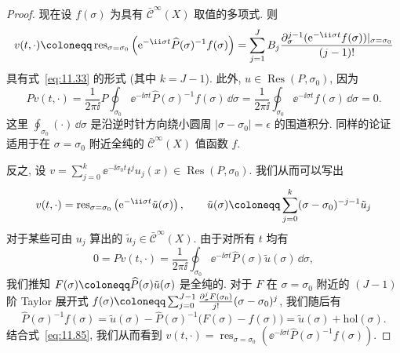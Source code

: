 \begin{proof}
现在设 $f(\sigma)$ 为具有 $\bar{\mathcal{C}}^\infty(X)$ 取值的多项式. 则
\begin{equation}\label{eq:11.83}
    v(t, \cdot) \defeq \operatorname{res}_{\sigma = \sigma_0}\left( \ee^{-\ii \sigma t} \widehat{P}(\sigma)^{-1} f(\sigma) \right) = \sum_{j=1}^J B_j \frac{\partial_\sigma^{j-1}(\ee^{-\ii \sigma t} f(\sigma))|_{\sigma=\sigma_0}}{(j-1)!}
\end{equation}
具有式~\eqref{eq:11.33} 的形式 (其中 $k = J - 1$). 此外, $u \in \operatorname{Res}(P, \sigma_0)$, 因为
\begin{equation}\label{eq:11.84}
    P v(t, \cdot) = \frac{1}{2\pi\ii} P \oint_{\sigma_0} \ee^{-\ii \sigma t} \widehat{P}(\sigma)^{-1} f(\sigma) \,\dd \sigma = \frac{1}{2\pi\ii} \oint_{\sigma_0} \ee^{-\ii \sigma t} f(\sigma) \,\dd \sigma = 0.
\end{equation}
这里 $\oint_{\sigma_0}(\cdot)\,\dd \sigma$ 是沿逆时针方向绕小圆周 $|\sigma - \sigma_0| = \epsilon$ 的围道积分. 同样的论证适用于在 $\sigma = \sigma_0$ 附近全纯的 $\bar{\mathcal{C}}^\infty(X)$ 值函数 $f$.

反之, 设 $v = \sum_{j=0}^k \ee^{-\ii \sigma_0 t} t^j u_j(x) \in \operatorname{Res}(P, \sigma_0)$. 我们从而可以写出
\begin{equation}\label{eq:11.85}
    v(t, \cdot) = \operatorname{res}_{\sigma = \sigma_0}\left( \ee^{-\ii \sigma t} \tilde u(\sigma) \right), \qquad \tilde u(\sigma) \defeq \sum_{j=0}^k (\sigma - \sigma_0)^{-j-1} \tilde u_j
\end{equation}
对于某些可由 $u_j$ 算出的 $\tilde u_j \in \bar{\mathcal{C}}^\infty(X)$. 由于对所有 $t$ 均有
\begin{equation}\label{eq:11.86}
    0 = P v(t, \cdot) = \frac{1}{2\pi\ii} \oint_{\sigma_0} \ee^{-\ii \sigma t} \widehat{P}(\sigma) \tilde u(\sigma) \,\dd \sigma,
\end{equation}
我们推知 $F(\sigma) \defeq \widehat{P}(\sigma) \tilde u(\sigma)$ 是全纯的. 对于 $F$ 在 $\sigma = \sigma_0$ 附近的 $(J - 1)$ 阶 Taylor 展开式 $f(\sigma) \defeq \sum_{j=0}^{J-1} \frac{\partial_\sigma^j F(\sigma_0)}{j!}(\sigma - \sigma_0)^j$, 我们随后有
\begin{equation}\label{eq:11.87}
    \widehat{P}(\sigma)^{-1} f(\sigma) = \tilde u(\sigma) - \widehat{P}(\sigma)^{-1}\big( F(\sigma) - f(\sigma) \big) = \tilde u(\sigma) + \mathrm{hol}(\sigma).
\end{equation}
结合式~\eqref{eq:11.85}, 我们从而看到 $v(t, \cdot) = \operatorname{res}_{\sigma = \sigma_0}\left( \ee^{-\ii \sigma t} \widehat{P}(\sigma)^{-1} f(\sigma) \right)$.
\end{proof}


